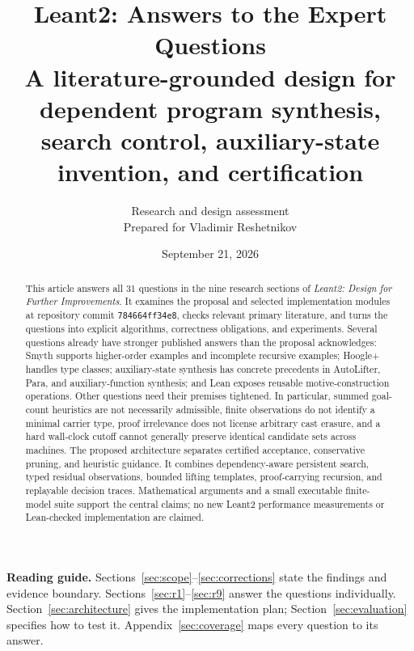 \documentclass[11pt,letterpaper]{article}
\title{\color{ink}\textbf{Leant2: Answers to the Expert Questions}\\[7pt]\large A literature-grounded design for dependent program synthesis,\\search control, auxiliary-state invention, and certification}
\author{Research and design assessment\\Prepared for Vladimir Reshetnikov}
\date{September 21, 2026}
\theoremstyle{definition}
\theoremstyle{remark}
\begin{document}
\maketitle
\begin{abstract}
This article answers all 31 questions in the nine research sections of
\emph{Leant2: Design for Further Improvements}. It examines the proposal and
selected implementation modules at repository commit
\texttt{784664ff34e8}, checks relevant primary literature, and turns the
questions into explicit algorithms, correctness obligations, and experiments.
Several questions already have stronger published answers than the proposal
acknowledges: Smyth supports higher-order examples and incomplete recursive
examples; Hoogle+ handles type classes; auxiliary-state synthesis has concrete
precedents in AutoLifter, Para, and auxiliary-function synthesis; and Lean
exposes reusable motive-construction operations. Other questions need their
premises tightened. In particular, summed goal-count heuristics are not
necessarily admissible, finite observations do not identify a minimal carrier
type, proof irrelevance does not license arbitrary cast erasure, and a hard
wall-clock cutoff cannot generally preserve identical candidate sets across
machines. The proposed architecture separates certified acceptance,
conservative pruning, and heuristic guidance. It combines dependency-aware
persistent search, typed residual observations, bounded lifting templates,
proof-carrying recursion, and replayable decision traces. Mathematical
arguments and a small executable finite-model suite support the central
claims; no new Leant2 performance measurements or Lean-checked implementation
are claimed.
\end{abstract}
\vspace{4pt}
\noindent\textbf{Reading guide.} Sections~\ref{sec:scope}--\ref{sec:corrections}
state the findings and evidence boundary. Sections~\ref{sec:r1}--\ref{sec:r9}
answer the questions individually. Section~\ref{sec:architecture} gives the
implementation plan; Section~\ref{sec:evaluation} specifies how to test it.
Appendix~\ref{sec:coverage} maps every question to its answer.
\clearpage
\tableofcontents
\clearpage










\appendix


\end{document}
